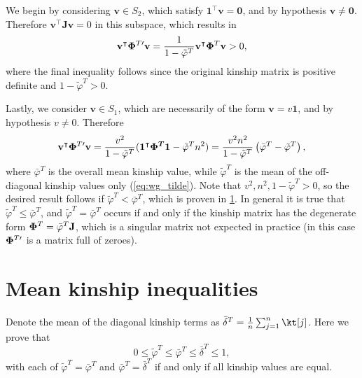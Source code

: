 \documentclass[11pt]{article}
\newcommand{\kinMat}[1][T]{%
  \ensuremath{%
    \mathbf{\Phi}^{#1}
  }%
  \xspace%
}%
\newcommand{\kinMatPrime}{%
  \ensuremath{%
    \mathbf{\Phi}^{T\prime}
  }%
  \xspace%
}%
\begin{document}
\begin{appendices}
  We begin by considering $\mathbf{v} \in S_2$, which satisfy $\mathbf{1}^\intercal \mathbf{v} = \mathbf{0}$, and by hypothesis $\mathbf{v} \ne \mathbf{0}$.
  Therefore $\mathbf{v}^\intercal \mathbf{J} \mathbf{v} = 0$ in this subspace, which results in
  $$
  \mathbf{v}^\intercal \kinMatPrime \mathbf{v}
  =
  \frac{1}{1-\tilde{\varphi}^T} \mathbf{v}^\intercal \kinMat \mathbf{v}
  >
  0
  ,
  $$
  where the final inequality follows since the original kinship matrix is positive definite and $1-\tilde{\varphi}^T > 0$.

  Lastly, we consider $\mathbf{v} \in S_1$, which are necessarily of the form $\mathbf{v} = v \mathbf{1}$, and by hypothesis $v \ne 0$.
  Therefore
  $$
  \mathbf{v}^\intercal \kinMatPrime \mathbf{v}
  =
  \frac{ v^2 }{1-\tilde{\varphi}^T}(\boldsymbol{1^\intercal \kinMat 1} - \tilde{\varphi}^T n^2)
  =
  \frac{ v^2 n^2 }{1-\tilde{\varphi}^T} \left( \bar{\varphi}^T - \tilde{\varphi}^T \right)
  ,
  $$
  where $\bar{\varphi}^T$ is the overall mean kinship value, while $\tilde{\varphi}^T$ is the mean of the off-diagonal kinship values only (\cref{eq:wg_tilde}).
  Note that $v^2, n^2, 1 - \tilde{\varphi}^T > 0$, so the desired result follows if $\tilde{\varphi}^T < \bar{\varphi}^T$, which is proven in \cref{sec:mean_kinship_ineqs}.
  In general it is true that $\tilde{\varphi}^T \le \bar{\varphi}^T$, and $\tilde{\varphi}^T = \bar{\varphi}^T$ occurs if and only if the kinship matrix has the degenerate form $\kinMat = \bar{\varphi}^T \mathbf{J}$, which is a singular matrix not expected in practice (in this case $\kinMatPrime$ is a matrix full of zeroes).

  \section{Mean kinship inequalities}

  \label{sec:mean_kinship_ineqs}

  Denote the mean of the diagonal kinship terms as $\bar{\delta}^T = \frac{1}{n} \sum_{j=1}^n \kt[j]$.
  Here we prove that
  $$
  0 \le \tilde{\varphi}^T \le \bar{\varphi}^T \le \bar{\delta}^T \le 1,
  $$
  with each of $\tilde{\varphi}^T = \bar{\varphi}^T$ and $\bar{\varphi}^T = \bar{\delta}^T$ if and only if all kinship values are equal.


\end{appendices}
\end{document}
